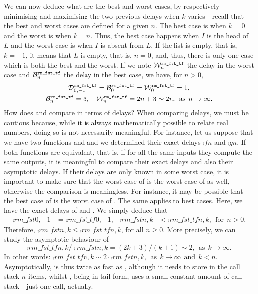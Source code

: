 We can now deduce what are the best and worst cases, by respectively
minimising and maximising the two previous delays when \(k\)
varies---recall that the best and worst cases are defined for a given
\(n\). The best case is when \(k=0\) and the worst is when
\(k=n\). Thus, the best case happens when \(I\) is the head of \(L\)
and the worst case is when \(I\) is absent from \(L\). If the list is
empty, that is, \(k=-1\), it means that \(L\) is empty, that is, \(n=0\),
and, thus, there is only one case which is both the best and the
worst. If we note \(\worst{rm\_fst\_tf}{n}\) the delay in the worst
case and \(\best{rm\_fst\_tf}{n}\) the delay in the best case, we
have, for \(n > 0\),
\begin{gather*}
\comp{rm\_fst\_tf}{0,-1} = \best{rm\_fst\_tf}{0} =
\worst{rm\_fst\_tf}{0} = 1,\\
\best{rm\_fst\_tf}{n}  = 3,\quad \worst{rm\_fst\_tf}{n} = 2n+3
\mathrel{\sim} 2n,\,\; \text{as} \,\; n \rightarrow \infty.
\end{gather*}
How does  and  compare in
terms of delays? When comparing delays, we must be cautious because,
while it is always mathematically possible to relate real numbers,
doing so is not necessarily meaningful. For instance, let us suppose
that we have two functions  and  and we
determined their exact delays \(\comp{f}{n}\) and \(\comp{g}{n}\). If
both functions are equivalent, that is, if for all the same inputs
they compute the same outputs, it is meaningful to compare their exact
delays and also their asymptotic delays. If their delays are only
known in some worst case, it is important to make sure that the worst
case of  is the worst case of  as well,
otherwise the comparison is meaningless. For instance, it may be
possible that the best case of  is the worst case of
. The same applies to best cases. Here, we have the exact
delays of  and . We simply
deduce that
\begin{align*}
  \comp{rm\_fst}{0,-1} &= \comp{rm\_fst\_tf}{0,-1},
& \comp{rm\_fst}{n,k} &< \comp{rm\_fst\_tf}{n,k},\,\; \text{for} \,\;
  n > 0.
\end{align*}
Therefore, \(\comp{rm\_fst}{n,k} \leqslant \comp{rm\_fst\_tf}{n,k}\),
for all \(n \geqslant 0\). More precisely, we can study the asymptotic
behaviour of
\[
\comp{rm\_fst\_tf}{n,k}/\comp{rm\_fst}{n,k} = (2k+3)/(k+1)
\mathrel{\sim} 2,\,\; \text{as} \,\; k \rightarrow \infty.
\]
In other words:
\(
\comp{rm\_fst\_tf}{n,k} \mathrel{\sim} 2 \cdot \comp{rm\_fst}{n,k},
\,\; \text{as} \,\; k \rightarrow \infty \,\; \text{and} \,\; k <
n.
\)
Asymptotically,  is thus twice as fast as
, although it needs to store in the call stack
\(n\) items, whilst , being in tail form, uses
a small constant amount of call stack---just one call, actually.

